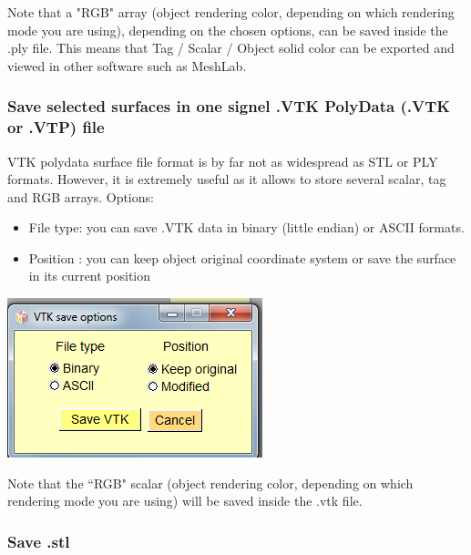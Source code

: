 Note that a "RGB" array (object rendering color, depending on which rendering mode you
are using), depending on the chosen options, can be saved inside the .ply file. This means that Tag / Scalar / Object solid color can be exported and viewed in other software such as MeshLab.


\subsubsection{Save selected surfaces in one signel .VTK PolyData (.VTK or .VTP) file}
\begin{minipage}{0.5\textwidth}
VTK polydata surface file format is by far not as widespread as STL or PLY
formats. However, it is extremely useful as it allows to store several
scalar, tag and RGB arrays.
Options:
\begin{itemize}
\item File type: you can save .VTK data in binary (little endian) or
ASCII formats.

\item Position : you can keep object original coordinate system
or save the surface in its current position
\end{itemize}
\end{minipage}    
\begin{minipage}{0.5\textwidth}\centering
  \includegraphics[scale=0.5]{images/File/Save_vtk.png}
 \end{minipage} 
\noindent
Note that the ``RGB" scalar (object rendering color, depending on which rendering mode you are
using) will be saved inside the .vtk file.


\subsubsection{Save .stl}

